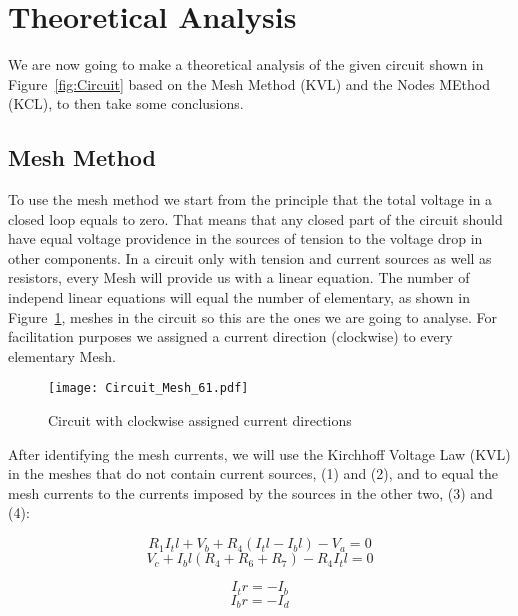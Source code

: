 \section{Theoretical Analysis}
\label{sec:analysis}

We are now going to make a theoretical analysis of the given circuit shown in Figure~\ref{fig:Circuit} based on the Mesh Method (KVL) and the Nodes MEthod (KCL), to then take some conclusions.

\subsection{Mesh Method}

To use the mesh method we start from the principle that the total voltage in a closed loop equals to zero. That means that any closed part of the circuit should have equal voltage providence in the sources of tension to the voltage drop in other components. In a circuit only with tension and current sources as well as resistors, every Mesh will provide us with a linear equation. The number of independ linear equations will equal the number of elementary, as shown in Figure~\ref{fig:Circuit_Mesh_Method}, meshes in the circuit so this are the ones we are going to analyse. For facilitation purposes we assigned a current direction (clockwise) to every elementary Mesh.


\begin{figure}[h] \centering
\texttt{[image: Circuit\_Mesh\_61.pdf]}
\caption{Circuit with clockwise assigned current directions}
\label{fig:Circuit_Mesh_Method}
\end{figure}


After identifying the mesh currents, we will use the Kirchhoff Voltage Law (KVL) in the meshes that do not contain current sources, (1) and (2), and to equal the mesh currents to the currents imposed by the sources in the other two, (3) and (4):

\begin{equation}
  R_1I_tl + V_b + R_4(I_tl-I_bl) - V_a = 0
  \label{eq:TL}
\end{equation}
\begin{equation}
  V_c + I_bl(R_4+R_6+R_7) - R_4I_tl = 0
  \label{eq:BL}
\end{equation}

\begin{equation}
  I_tr = - I_b
  \label{eq:TR}
\end{equation}
\begin{equation}
  I_br = - I_d
  \label{eq: BR}
\end{equation}

